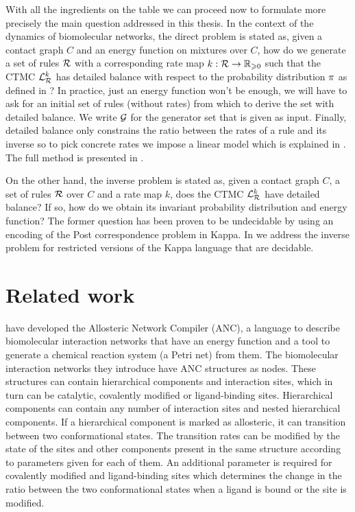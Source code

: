 With all the ingredients on the table
we can proceed now to formulate more precisely
the main question addressed in this thesis.
In the context of the dynamics of biomolecular networks,
the direct problem is stated as,
given a contact graph $C$ and
an energy function on mixtures over $C$,
how do we generate a set of rules $\mathcal{R}$
with a corresponding rate map $k: \mathcal{R} \to \mathbb{R}_{\geqslant 0}$
such that the CTMC $\mathcal{L}^k_{\mathcal{R}}$ has detailed balance with respect to
the probability distribution $\pi$ as defined in ?
In practice, just an energy function won't be enough,
we will have to ask for an initial set of rules (without rates)
from which to derive the set with detailed balance.
We write $\mathcal{G}$ for the generator set that is given as input.
Finally, detailed balance only constrains the ratio between
the rates of a rule and its inverse so to pick concrete rates
we impose a linear model which is explained in .
The full method is presented in .

On the other hand, the inverse problem is stated as,
given a contact graph $C$,
a set of rules $\mathcal{R}$ over $C$
and a rate map $k$,
does the CTMC $\mathcal{L}^k_{\mathcal{R}}$ have detailed balance?
If so, how do we obtain
its invariant probability distribution and energy function?
The former question has been proven to be undecidable by \citet{et1}
using an encoding of the Post correspondence problem \citep{post}
in Kappa.
In  we address the inverse problem for
restricted versions of the Kappa language
that are decidable.


\section{Related work}

\citet{anc} have developed the Allosteric Network Compiler
(ANC), a language to describe biomolecular interaction networks
that have an energy function and a tool to generate
a chemical reaction system (\ie a Petri net) from them.
The biomolecular interaction networks they introduce
have ANC structures as nodes.
These structures can contain hierarchical components and
interaction sites, which in turn can be catalytic,
covalently modified or ligand-binding sites.
Hierarchical components can contain any number of
interaction sites and nested hierarchical components.
If a hierarchical component is marked as allosteric,
it can transition between two conformational states.
The transition rates can be modified by the state of the sites and
other components present in the same structure
according to parameters given for each of them.
An additional parameter is required for covalently modified
and ligand-binding sites which determines the change in the ratio
between the two conformational states when a ligand is bound
or the site is modified.

